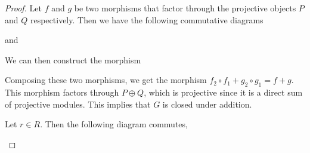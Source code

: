 \begin{proof}
    Let \( f \) and \( g \) be two morphisms that factor through the projective objects \( P \) and \( Q \) respectively. Then we have the following commutative diagrams
    \begin{center}
        and
    \end{center}

    We can then construct the morphism
    \begin{center}
    \end{center}

    Composing these two morphisms, we get the morphism \( f_2 \circ f_1 + g_2 \circ g_1 = f + g \). This morphism factors through \( P \oplus Q \), which is projective since it is a direct sum of projective modules. This implies that \( G \) is closed under addition.
    
    Let \( r \in R \). Then the following diagram commutes,
    \begin{center}
\end{center}
\end{proof}

